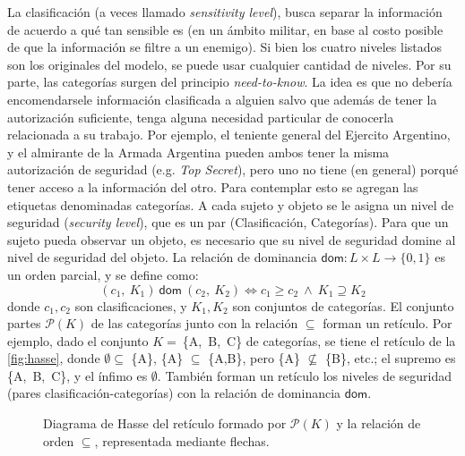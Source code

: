 \documentclass{article}
\theoremstyle{definition}
\begin{document}
La clasificación (a veces llamado \textit{sensitivity level}), busca
separar la información de acuerdo a qué tan sensible es (en un ámbito militar,
en base al costo posible de que la información se filtre a un enemigo). Si bien
los cuatro niveles listados son los originales del modelo, se puede usar
cualquier cantidad de niveles. Por su parte, las categorías surgen del principio \textit{need-to-know}. La idea es que
no debería encomendarsele información clasificada a alguien salvo que
además de tener la autorización suficiente, tenga alguna necesidad particular de conocerla relacionada
a su trabajo. Por ejemplo, el teniente general del Ejercito Argentino, y el
almirante de la Armada Argentina pueden ambos tener la misma autorización de
seguridad (e.g. \textit{Top Secret}), pero uno no tiene (en general) porqué tener acceso a la
información del otro. Para contemplar esto se agregan las etiquetas
denominadas categorías. A cada sujeto y objeto se le asigna un nivel de
seguridad (\textit{security level}), que es un par (Clasificación, Categorías).
Para que un sujeto pueda observar un objeto, es necesario que su nivel de
seguridad domine al nivel de seguridad del objeto. La relación de
dominancia $\mathsf{dom}\colon L\times L \to \{0,1\}$ es un orden parcial, y se define como:
\[ (c_1,~K_1)~\mathsf{dom}~(c_2,~K_2) \Longleftrightarrow c_1 \geq c_2~\wedge~K_1 \supseteq K_2\] 
donde $c_1, c_2$ son clasificaciones, y $K_1, K_2$ son conjuntos de categorías.
El conjunto partes $\mathcal{P}(K)$ de las categorías junto con la
relación $\subseteq$ forman un retículo. Por ejemplo, dado el conjunto
$K=~$\mbox{\{A, B, C\}} de categorías, se tiene el retículo de la \autoref{fig:hasse},
donde $\emptyset \subseteq$ \{A\}, \{A\} $\subseteq$ \{A,B\}, pero \{A\}
$\nsubseteq$ \{B\}, etc.; el supremo es \mbox{\{A, B, C\}}, y el ínfimo es
$\emptyset$. También forman un retículo los niveles de seguridad (pares clasificación-categorías) con la relación de dominancia $\mathsf{dom}$.

\begin{figure}[htp]
  \centering
\begin{minipage}{.46\textwidth}
  \centering
  \caption{\label{fig:hasse} Diagrama de Hasse del retículo formado por $\mathcal{P}(K)$ y la
  relación de orden $\subseteq$, representada mediante flechas.}
\end{minipage}
\end{figure}
\end{document}
